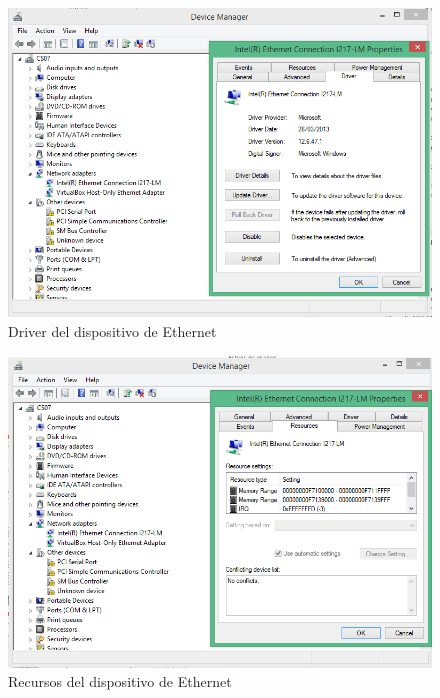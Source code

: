 \documentclass[a4paper,12pt]{article}
\begin{document}
 \begin{figure}[H]
  \centering
  \includegraphics[scale = 0.5]{3.png}
  \caption{Driver del dispositivo de Ethernet}
 \end{figure}

 \begin{figure}[H]
  \centering
  \includegraphics[scale = 0.5]{4.png}
  \caption{Recursos del dispositivo de Ethernet}
 \end{figure}
 
\end{document}

